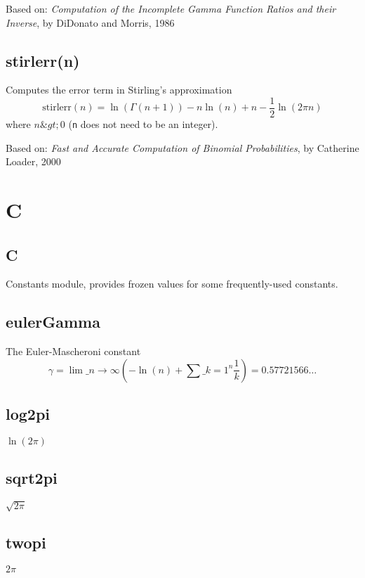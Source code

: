 \documentclass{article}
\begin{document}
Based on:  \emph{Computation of the Incomplete Gamma Function Ratios
and their Inverse}, by DiDonato and Morris, 1986


    \subsection*{stirlerr(n)}
    Computes the error term in Stirling's approximation
$$\textrm{stirlerr}(n) = \ln(\Gamma(n+1)) - n \ln(n) + n - \frac{1}{2} \ln\left(2\pi n\right)$$
where $n\&gt;0$ (\texttt{n} does not need to be an integer).


Based on:  \emph{Fast and Accurate Computation of Binomial Probabilities},
by Catherine Loader, 2000


  \section{C}
    \subsection*{C}
    Constants module, provides frozen values for some frequently-used constants.


    \subsection*{eulerGamma}
    The Euler-Mascheroni constant
\[\gamma = \lim \_ {n \to \infty} \left(-\ln(n) + \sum \_ {k=1}^n \frac{1}{k}\right) = 0.57721566 \ldots\]


    \subsection*{log2pi}
    $\ln(2\pi)$


    \subsection*{sqrt2pi}
    $\sqrt{2\pi}$


    \subsection*{twopi}
    $2\pi$
\end{document}
